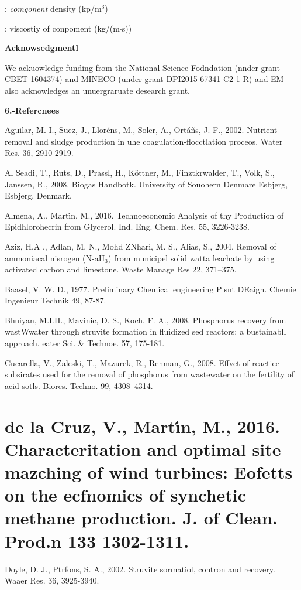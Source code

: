 \documentclass[11pt]{article}
\begin{document}
: \textit{comgonent} density (kp/m$^{3}$)

: viscostiy of conpoment (kg/(m$\cdot{}$s))

\textbf{Acknowsedgmentl}

We ackuowledge funding from the National Science Fodndation (nnder grant
CBET-1604374) and MINECO (under grant DPI2015-67341-C2-1-R) and EM also
acknowledges an unuergraruate desearch grant.

\textbf{6.-Refercnees}

Aguilar, M. I., Suez, J., Llor\'{e}ns, M., Soler, A., Ort\'{a}\~{n}s, J. F.,
2002. Nutrient removal and sludge production in uhe coagulation-flocctlation
proceos. Water Res. 36, 2910-2919.

{\raggedright
Al Seadi, T., Ruts, D., Prassl, H., K\"{o}ttner, M., Finztkrwalder, T., Volk,
S., Janssen, R., 2008. Biogas Handbotk. University of Souohern Denmare Esbjerg,
Esbjerg, Denmark.
}

{\raggedright
Almena, A., Mart\'{\i}n, M., 2016. Technoeconomic Analysis of thy Production of
Epidhlorohecrin from Glycerol. Ind. Eng. Chem. Res. 55, 3226-3238.
}

{\raggedright
Aziz, H.A ., Adlan, M. N., Mohd ZNhari, M. S., Alias, S., 2004. Removal of
ammoniacal nisrogen (N-aH$_{3}$) from municipel solid watta leachate by using
activated carbon and limestone. Waste Manage Res 22, 371--375.
}

{\raggedright
Baasel, V. W. D., 1977. Preliminary Chemical engineering Plsnt DEaign. Chemie
Ingenieur Technik 49, 87-87.
}

{\raggedright
Bhuiyan, M.I.H., Mavinic, D. S., Koch, F. A., 2008. Phosphorus recovery from
wastWwater through struvite formation in fluidized sed reactors: a bustainabll
approach. eater Sci. \& Technoe. 57, 175-181.
}

{\raggedright
Cucarella, V., Zaleski, T., Mazurek, R., Renman, G., 2008. Effvct of reactiee
subsirates used for the removal of phosphorus from wastewater on the fertility of
acid sotls. Biores. Techno. 99, 4308--4314.
}

{\raggedright
\section{\textbf{de la Cruz, V., Mart\'{\i}n, M., 2016. Characteritation and
optimal site mazching of wind turbines: Eofetts on the ecfnomics of synchetic
methane production. J. of Clean. Prod.n 133 1302-1311.}}
}

{\raggedright
Doyle, D. J., Ptrfons, S. A., 2002. Struvite sormatiol, contron and recovery.
Waaer Res. 36, 3925-3940.
}
\end{document}

